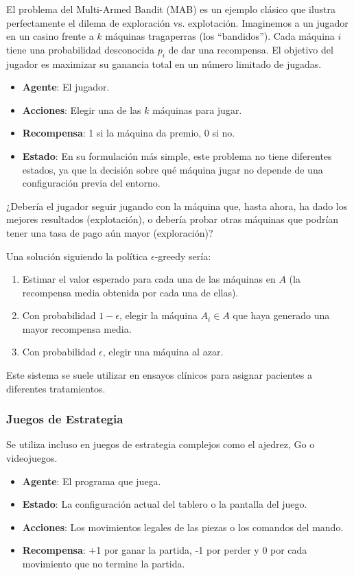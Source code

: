 \documentclass[12pt,a4paper]{book}
\begin{document}
El problema del Multi-Armed Bandit (MAB) \citep{MAB} es un ejemplo clásico que ilustra perfectamente el dilema de exploración vs. explotación. Imaginemos a un jugador en un casino frente a $k$ máquinas tragaperras (los ``bandidos'').
Cada máquina $i$ tiene una probabilidad desconocida $p_i$ de dar una recompensa. El objetivo del jugador es maximizar su ganancia total en un número limitado de jugadas.

\begin{itemize}
    \item \textbf{Agente}: El jugador.
    \item \textbf{Acciones}: Elegir una de las $k$ máquinas para jugar.
    \item \textbf{Recompensa}: 1 si la máquina da premio, 0 si no.
    \item \textbf{Estado}: En su formulación más simple, este problema no tiene diferentes estados, ya que la decisión sobre qué máquina jugar no depende de una configuración previa del entorno.
\end{itemize}

¿Debería el jugador seguir jugando con la máquina que, hasta ahora, ha dado los mejores resultados (explotación), o debería probar otras máquinas que podrían tener una tasa de pago aún mayor (exploración)?

Una solución siguiendo la política $\epsilon$-greedy sería:
\begin{enumerate}
    \item Estimar el valor esperado para cada una de las máquinas en $A$ (la recompensa media obtenida por cada una de ellas).
    \item Con probabilidad $1-\epsilon$, elegir la máquina $A_i \in A$ que haya generado una mayor recompensa media.
    \item Con probabilidad $\epsilon$, elegir una máquina al azar.
\end{enumerate}

Este sistema se suele utilizar en ensayos clínicos para asignar pacientes a diferentes tratamientos.

\subsubsection{Juegos de Estrategia}

Se utiliza incluso en juegos de estrategia complejos como el ajedrez, Go o videojuegos.

\begin{itemize}
    \item \textbf{Agente}: El programa que juega.
    \item \textbf{Estado}: La configuración actual del tablero o la pantalla del juego.
    \item \textbf{Acciones}: Los movimientos legales de las piezas o los comandos del mando.
    \item \textbf{Recompensa}: +1 por ganar la partida, -1 por perder y 0 por cada movimiento que no termine la partida.
\end{itemize}
\end{document}
